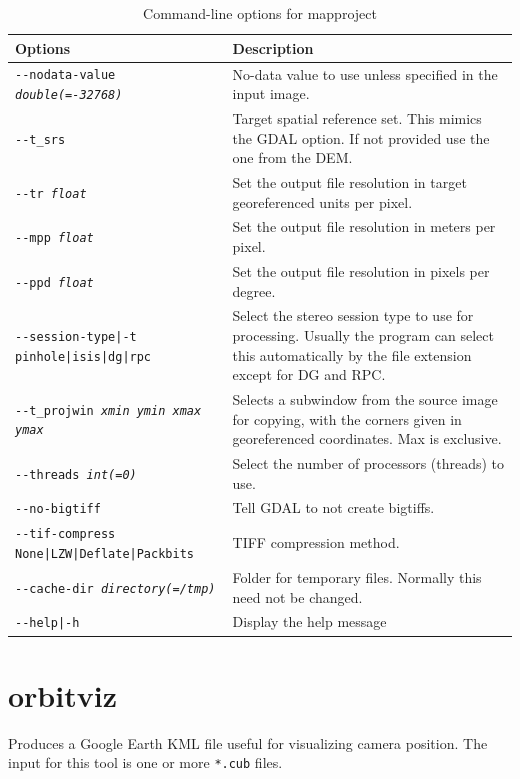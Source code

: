 \begin{longtable}{|l|p{10cm}|}
\caption{Command-line options for mapproject}
\label{tbl:mapproject}
\endfirsthead
\endhead
\endfoot
\endlastfoot
\hline
Options & Description \\ \hline \hline
\texttt{-\/-nodata-value \textit{double(=-32768)}} & No-data value to use unless specified in the input image. \\ \hline
\texttt{-\/-t\_srs} & Target spatial reference set. This mimics the GDAL
option. If not provided use the one from the DEM. \\ \hline
\texttt{-\/-tr \textit{float}} & Set the output file resolution in target
  georeferenced units per pixel. \\ \hline
\texttt{-\/-mpp \textit{float}} & Set the output file resolution in meters per
pixel. \\ \hline
\texttt{-\/-ppd \textit{float}} & Set the output file resolution in pixels per
degree. \\ \hline
\texttt{-\/-session-type|-t pinhole|isis|dg|rpc} & Select the stereo
session type to use for processing. Usually the program can select this
automatically by the file extension except for DG and RPC.\\ \hline
\texttt{-\/-t\_projwin \textit{xmin ymin xmax ymax}} & Selects a subwindow from the source image for copying, with the corners given in georeferenced coordinates. Max is exclusive. \\ \hline
\texttt{-\/-threads \textit{int(=0)}} & Select the number of processors (threads) to use.\\ \hline
\texttt{-\/-no-bigtiff} & Tell GDAL to not create bigtiffs.\\ \hline
\texttt{-\/-tif-compress None|LZW|Deflate|Packbits} & TIFF compression method.\\ \hline
\texttt{-\/-cache-dir \textit{directory(=/tmp)}} & Folder for temporary files. Normally this need not be changed.\\ \hline
\texttt{-\/-help|-h} & Display the help message\\ \hline
\end{longtable}

\clearpage

\section{orbitviz}
\label{orbitviz}

Produces a Google Earth \ac{KML} file useful for visualizing camera
position. The input for this tool is one or more \texttt{*.cub} files.

